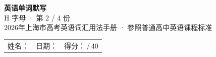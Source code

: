 \documentclass[10pt,a4paper]{article}
\begin{document}
\pagestyle{plain}

\begin{center}
{\LARGE\bfseries 英语单词默写}\\[0.22em]
{\large H 字母 · 第 2 / 4 份}\\[0.18em]
{\small 2026年上海市高考英语词汇用法手册 · 参照普通高中英语课程标准}
\end{center}

\vspace{0.25em}
\noindent\begin{tabular}{@{}p{}@{}p{}@{}p{}@{}}
姓名：\underline{\hspace{2.0cm}} & 日期：\underline{\hspace{2.0cm}} & 得分：\underline{\hspace{1.3cm}}\,/\,40 \\
\end{tabular}

\vspace{0.3em}

\vspace{0.08em}
\end{document}
